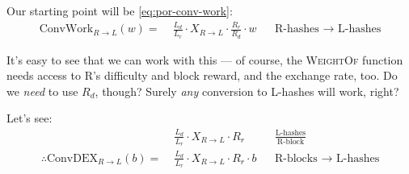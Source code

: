 
Our starting point will be \autoref{eq:por-conv-work}:
\begin{align}
  \text{ConvWork}_{R\rightarrow L}(w) = \; & \frac{L_d}{L_r} \cdot X_{R\rightarrow L} \cdot \frac{R_r}{R_d} \cdot w
    & &\text{R-hashes }\rightarrow\text{ L-hashes}
    \nonumber
\end{align}

It's easy to see that we can work with this --- of course, the \textsc{WeightOf} function needs access to R's difficulty and block reward, and the exchange rate, too.
Do we \emph{need} to use $R_d$, though?
Surely \emph{any} conversion to L-hashes will work, right?

Let's see:
\begin{align}
    & \frac{L_d}{L_r} \cdot X_{R\rightarrow L} \cdot R_r
        & & \frac{\text{L-hashes}}{\text{R-block}}
        \nonumber
        \\[0.5em]
    \therefore \text{ConvDEX}_{R\rightarrow L}(b) = \; & \frac{L_d}{L_r} \cdot X_{R\rightarrow L} \cdot R_r \cdot b
        & & \text{R-blocks }\rightarrow\text{ L-hashes}
        \label{eq:por-conv-dex}
\end{align}

